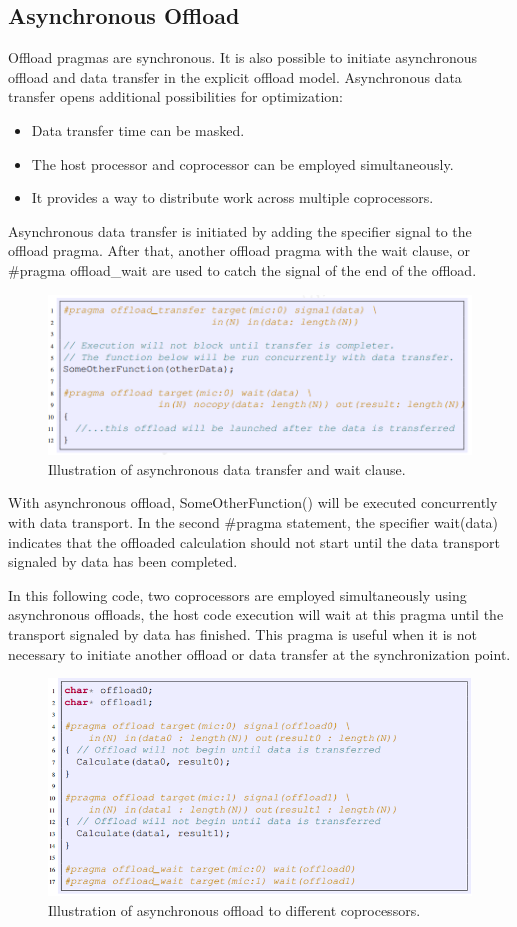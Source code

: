 \documentclass[12pt]{article}
\begin{document}
\subsection{Asynchronous Offload}
Offload pragmas are synchronous. It is also possible to initiate asynchronous offload and data transfer in the explicit offload model. Asynchronous data transfer opens additional possibilities for optimization:
\begin{itemize}
\item Data transfer time can be masked.
\item The host processor and coprocessor can be employed simultaneously.
\item It provides a way to distribute work across multiple coprocessors.
\end{itemize}
Asynchronous data transfer is initiated by adding the specifier signal to
the offload pragma. After that, another offload pragma with the wait clause,
or \#pragma offload\_wait are used to catch the signal of the end of
the offload. 
\begin{figure}[H]
\centering
\includegraphics[scale = 0.9]{chainer18.png}
\caption{Illustration of asynchronous data transfer and wait clause.}
\end{figure}
With asynchronous offload, SomeOtherFunction() will be executed concurrently with data transport. In the second \#pragma statement, the specifier wait(data) indicates that the offloaded calculation should not start until the data transport signaled by data has been completed.

In this following code, two coprocessors are employed simultaneously using asynchronous offloads, the host code execution will wait at this pragma until the transport signaled by data has finished. This pragma is useful when it is not necessary to initiate another offload or data transfer at the synchronization point.
\begin{figure}[H]
\centering
\includegraphics[scale = 0.9]{chainer19.png}
\caption{Illustration of asynchronous offload to different coprocessors.}
\end{figure}
\end{document}
